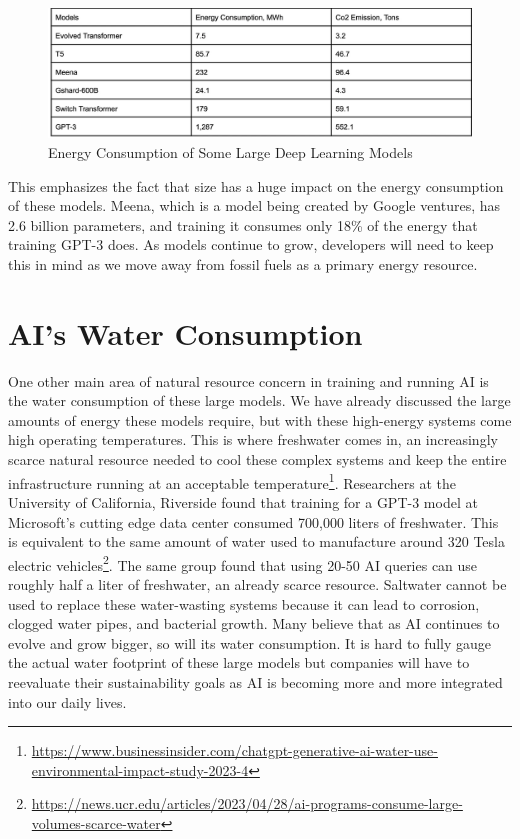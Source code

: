\documentclass[
]{book}
\begin{document}
\begin{figure}
\centering
\includegraphics{figures/figure4.png}
\caption{Energy Consumption of Some Large Deep Learning Models}
\end{figure}

This emphasizes the fact that size has a huge impact on the energy consumption of these models. Meena, which is a model being created by Google ventures, has 2.6 billion parameters, and training it consumes only 18\% of the energy that training GPT-3 does. As models continue to grow, developers will need to keep this in mind as we move away from fossil fuels as a primary energy resource.

\hypertarget{ais-water-consumption}{%
\section{AI's Water Consumption}\label{ais-water-consumption}}

One other main area of natural resource concern in training and running AI is the water consumption of these large models. We have already discussed the large amounts of energy these models require, but with these high-energy systems come high operating temperatures. This is where freshwater comes in, an increasingly scarce natural resource needed to cool these complex systems and keep the entire infrastructure running at an acceptable temperature\footnote{\url{https://www.businessinsider.com/chatgpt-generative-ai-water-use-environmental-impact-study-2023-4}}. Researchers at the University of California, Riverside found that training for a GPT-3 model at Microsoft's cutting edge data center consumed 700,000 liters of freshwater. This is equivalent to the same amount of water used to manufacture around 320 Tesla electric vehicles\footnote{\url{https://news.ucr.edu/articles/2023/04/28/ai-programs-consume-large-volumes-scarce-water}}. The same group found that using 20-50 AI queries can use roughly half a liter of freshwater, an already scarce resource. Saltwater cannot be used to replace these water-wasting systems because it can lead to corrosion, clogged water pipes, and bacterial growth. Many believe that as AI continues to evolve and grow bigger, so will its water consumption. It is hard to fully gauge the actual water footprint of these large models but companies will have to reevaluate their sustainability goals as AI is becoming more and more integrated into our daily lives.
\end{document}
